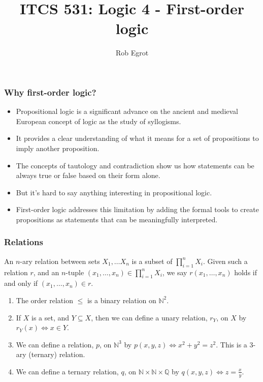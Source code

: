 \documentclass[handout]{beamer}
\title{ITCS 531: Logic 4 - First-order logic}
\date{}
\author{Rob Egrot}
\newcommand{\bN}{\mathbb{N}}
\newcommand{\bQ}{\mathbb{Q}}
\begin{document}
\begin{frame}
\titlepage
\end{frame}

\begin{frame}
\frametitle{Why first-order logic?}
\begin{itemize}
\item Propositional logic is a significant advance on the ancient and medieval European concept of logic as the study of syllogisms.
\vspace{0.3cm}
\item It provides a clear understanding of what it means for a set of propositions to imply another proposition.
\vspace{0.3cm}
\item The concepts of tautology and contradiction show us how statements can be always true or false based on their form alone.
\vspace{0.3cm}
\item But it's hard to say anything interesting in propositional logic.
\vspace{0.3cm}
\item First-order logic addresses this limitation by adding the formal tools to create propositions as statements that can be meaningfully interpreted.
\end{itemize}
\end{frame}

\begin{frame}
\frametitle{Relations}
\begin{definition}[Relation]
An $n$-ary relation between sets $X_1,\ldots X_n$ is a subset of $\prod_{i=1}^n X_i$. Given such a relation $r$, and an $n$-tuple $(x_1,\ldots,x_n)\in \prod_{i=1}^n X_i$, we say $r(x_1,\ldots,x_n)$ holds if and only if $(x_1,\ldots,x_n)\in r$. 
\end{definition}

\begin{example}
\begin{enumerate}
\item The order relation $\leq$ is a binary relation on $\bN^2$.
\item If $X$ is a set, and $Y\subseteq X$, then we can define a unary relation, $r_Y$, on $X$ by $r_Y(x)\iff x\in Y$.
\item We can define a relation, $p$, on $\bN^3$ by $p(x,y,z)\iff x^2+ y^2 = z^2$. This is a $3$-ary (ternary) relation.
\item We can define a ternary relation, $q$, on $\bN\times \bN \times \bQ$ by $q(x,y,z)\iff z=\frac{x}{y}$.
\end{enumerate}
\end{example}
\end{frame}
\end{document}
